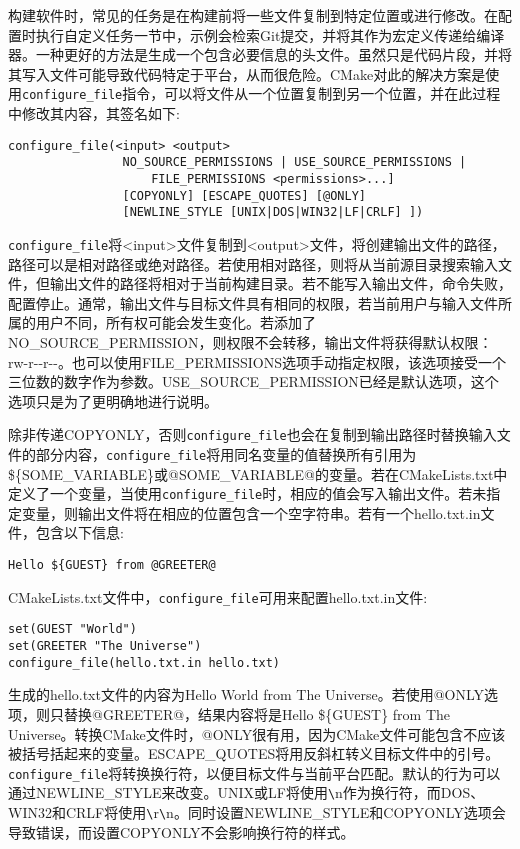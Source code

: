 构建软件时，常见的任务是在构建前将一些文件复制到特定位置或进行修改。在配置时执行自定义任务一节中，示例会检索Git提交，并将其作为宏定义传递给编译器。一种更好的方法是生成一个包含必要信息的头文件。虽然只是代码片段，并将其写入文件可能导致代码特定于平台，从而很危险。CMake对此的解决方案是使用\texttt{configure\_file}指令，可以将文件从一个位置复制到另一个位置，并在此过程中修改其内容，其签名如下:

\begin{lstlisting}[style=styleCMake]
configure_file(<input> <output>
				NO_SOURCE_PERMISSIONS | USE_SOURCE_PERMISSIONS |
					FILE_PERMISSIONS <permissions>...]
				[COPYONLY] [ESCAPE_QUOTES] [@ONLY]
				[NEWLINE_STYLE [UNIX|DOS|WIN32|LF|CRLF] ])
\end{lstlisting}

\texttt{configure\_file}将<input>文件复制到<output>文件，将创建输出文件的路径，路径可以是相对路径或绝对路径。若使用相对路径，则将从当前源目录搜索输入文件，但输出文件的路径将相对于当前构建目录。若不能写入输出文件，命令失败，配置停止。通常，输出文件与目标文件具有相同的权限，若当前用户与输入文件所属的用户不同，所有权可能会发生变化。若添加了NO\_SOURCE\_PERMISSION，则权限不会转移，输出文件将获得默认权限：rw-r-{}-r-{}-。也可以使用FILE\_PERMISSIONS选项手动指定权限，该选项接受一个三位数的数字作为参数。USE\_SOURCE\_PERMISSION已经是默认选项，这个选项只是为了更明确地进行说明。

除非传递COPYONLY，否则\texttt{configure\_file}也会在复制到输出路径时替换输入文件的部分内容，\texttt{configure\_file}将用同名变量的值替换所有引用为\$\{SOME\_VARIABLE\}或@SOME\_VARIABLE@的变量。若在CMakeLists.txt中定义了一个变量，当使用\texttt{configure\_file}时，相应的值会写入输出文件。若未指定变量，则输出文件将在相应的位置包含一个空字符串。若有一个hello.txt.in文件，包含以下信息:

\begin{lstlisting}[style=styleCMake]
Hello ${GUEST} from @GREETER@
\end{lstlisting}

CMakeLists.txt文件中，\texttt{configure\_file}可用来配置hello.txt.in文件:

\begin{lstlisting}[style=styleCMake]
set(GUEST "World")
set(GREETER "The Universe")
configure_file(hello.txt.in hello.txt)
\end{lstlisting}

生成的hello.txt文件的内容为Hello World from The
Universe。若使用@ONLY选项，则只替换@GREETER@，结果内容将是Hello \$\{GUEST\} from The
Universe。转换CMake文件时，@ONLY很有用，因为CMake文件可能包含不应该被括号括起来的变量。ESCAPE\_QUOTES将用反斜杠转义目标文件中的引号。\texttt{configure\_file}将转换换行符，以便目标文件与当前平台匹配。默认的行为可以通过NEWLINE\_STYLE来改变。UNIX或LF将使用\verb|\|n作为换行符，而DOS、WIN32和CRLF将使用\verb|\|r\verb|\|n。同时设置NEWLINE\_STYLE和COPYONLY选项会导致错误，而设置COPYONLY不会影响换行符的样式。

